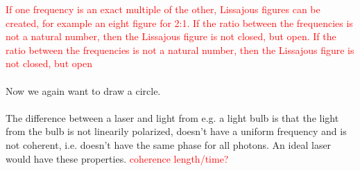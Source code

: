 \textcolor{red}{If one frequency is an exact multiple of the other,
Lissajous figures can be created, for example an eight figure for 2:1.
If the ratio between the frequencies is not a natural number,
then the Lissajous figure is not closed, but open.
If the ratio between the frequencies is not a natural number,
then the Lissajous figure is not closed, but open} \\ \\
Now we again want to draw a circle. \\ \\
The difference between a laser and light from e.g. a light bulb is that
the light from the bulb is not linearily polarized, doesn't have a
uniform frequency and is not coherent, i.e. doesn't have the same phase
for all photons. An ideal laser would have these properties.
\textcolor{red}{coherence length/time?}
